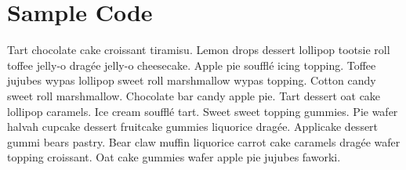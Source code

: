 \chapter{Sample Code}
Tart chocolate cake croissant tiramisu. Lemon drops dessert lollipop tootsie roll toffee jelly-o dragée jelly-o cheesecake. Apple pie soufflé icing topping. Toffee jujubes wypas lollipop sweet roll marshmallow wypas topping. Cotton candy sweet roll marshmallow. Chocolate bar candy apple pie. Tart dessert oat cake lollipop caramels. Ice cream soufflé tart. Sweet sweet topping gummies. Pie wafer halvah cupcake dessert fruitcake gummies liquorice dragée. Applicake dessert gummi bears pastry. Bear claw muffin liquorice carrot cake caramels dragée wafer topping croissant. Oat cake gummies wafer apple pie jujubes faworki.
